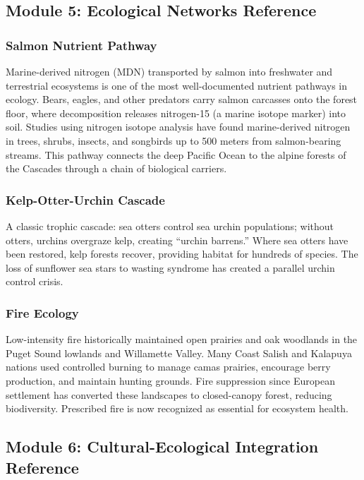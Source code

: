 \documentclass[11pt,letterpaper]{article}
\begin{document}
\subsection{Module 5: Ecological Networks Reference}

\subsubsection{Salmon Nutrient Pathway}

Marine-derived nitrogen (MDN) transported by salmon into freshwater and terrestrial ecosystems is one of the most well-documented nutrient pathways in ecology. Bears, eagles, and other predators carry salmon carcasses onto the forest floor, where decomposition releases nitrogen-15 (a marine isotope marker) into soil. Studies using nitrogen isotope analysis have found marine-derived nitrogen in trees, shrubs, insects, and songbirds up to 500 meters from salmon-bearing streams. This pathway connects the deep Pacific Ocean to the alpine forests of the Cascades through a chain of biological carriers.

\subsubsection{Kelp-Otter-Urchin Cascade}

A classic trophic cascade: sea otters control sea urchin populations; without otters, urchins overgraze kelp, creating ``urchin barrens.'' Where sea otters have been restored, kelp forests recover, providing habitat for hundreds of species. The loss of sunflower sea stars to wasting syndrome has created a parallel urchin control crisis.

\subsubsection{Fire Ecology}

Low-intensity fire historically maintained open prairies and oak woodlands in the Puget Sound lowlands and Willamette Valley. Many Coast Salish and Kalapuya nations used controlled burning to manage camas prairies, encourage berry production, and maintain hunting grounds. Fire suppression since European settlement has converted these landscapes to closed-canopy forest, reducing biodiversity. Prescribed fire is now recognized as essential for ecosystem health.

\subsection{Module 6: Cultural-Ecological Integration Reference}
\end{document}
